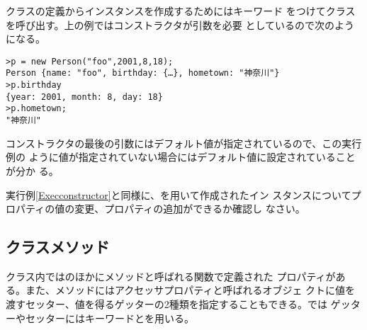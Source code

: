 クラスの定義からインスタンスを作成するためにはキーワード
をつけてクラスを呼び出す。上の例ではコンストラクタが引数を必要
としているので次のようになる。
\begin{Verbatim}
>p = new Person("foo",2001,8,18);
Person {name: "foo", birthday: {…}, hometown: "神奈川"}
>p.birthday
{year: 2001, month: 8, day: 18}
>p.hometown;
"神奈川"
\end{Verbatim}
コンストラクタの最後の引数にはデフォルト値が指定されているので、この実行例の
ように値が指定されていない場合にはデフォルト値に設定されていることが分か
る。
\begin{Prob}\upshape
実行例\ref{Execconstructor}と同様に、を用いて作成されたイン
 スタンスについてプロパティの値の変更、プロパティの追加ができるか確認し
 なさい。
\end{Prob}
\subsection{クラスメソッド}
クラス内ではのほかにメソッドと呼ばれる関数で定義された
プロパティがある。また、メソッドにはアクセッサプロパティと呼ばれるオブジェ
クトに値を渡すセッター、値を得るゲッターの2種類を指定することもできる。\ES では
ゲッターやセッターにはキーワードとを用いる。
